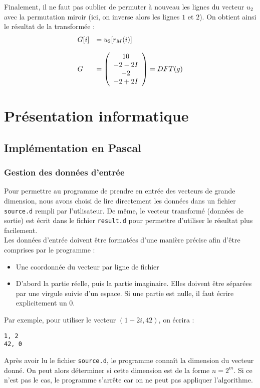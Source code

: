 \documentclass{report}
\begin{document}
		Finalement, il ne faut pas oublier de permuter à nouveau les lignes du vecteur $u_2$ avec la permutation miroir (ici, on inverse alors les lignes $1$ et $2$). On obtient ainsi le résultat de la transformée :
		\[
		\begin{array}{l l}
			G[i]	& = u_2[r_M(i)] \\
					& 	\\
			G 		& =	\left (
						\begin{array}{c}
							10\\
							-2 - 2I\\
							-2\\
							-2 + 2I
						\end{array}
						\right )
					  = DFT(g)
		\end{array}
		\]




	\chapter{Présentation informatique}



	\section{Implémentation en Pascal}
	\subsection{Gestion des données d'entrée}
	Pour permettre au programme de prendre en entrée des vecteurs de grande dimension, nous avons choisi de lire directement les données dans un fichier \texttt{source.d} rempli par l'utlisateur. De même, le vecteur transformé (données de sortie) est écrit dans le fichier \texttt{result.d} pour permettre d'utiliser le résultat plus facilement.\\
	Les données d'entrée doivent être formatées d'une manière précise afin d'être comprises par le programme :
	\begin{itemize}
		\item Une coordonnée du vecteur par ligne de fichier
		\item D'abord la partie réelle, puis la partie imaginaire. Elles doivent être séparées par une virgule suivie d'un espace. Si une partie est nulle, il faut écrire explicitement un $0$.
	\end{itemize}
	Par exemple, pour utiliser le vecteur $(1+2i, 42)$, on écrira :
	\begin{lstlisting}
1, 2
42, 0
	\end{lstlisting}
	Après avoir lu le fichier \texttt{source.d}, le programme connaît la dimension du vecteur donné. On peut alors déterminer si cette dimension est de la forme $n=2^m$. Si ce n'est pas le cas, le programme s'arrête car on ne peut pas appliquer l'algorithme.
\end{document}
